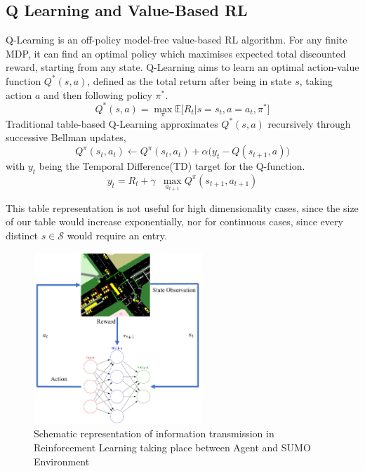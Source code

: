 \documentclass[conference]{IEEEtran}
\begin{document}
\subsection{Q Learning and Value-Based RL}
Q-Learning\cite{watkins} is an off-policy model-free value-based RL algorithm. For any finite MDP, it can find an optimal policy which maximises expected total discounted reward, starting from any state\cite{melo}.
Q-Learning aims to learn an optimal action-value function $Q^*(s,a)$, defined as the total return after being in state $s$, taking action $a$ and then following policy $\pi^*$. %
\begin{equation}
Q^*(s,a) = \max_{\pi} \mathbb{E} \big[ R_t | s=s_t, a=a_t, \pi^* \big]
\label{eq:qlearning}
\end{equation}
Traditional table-based Q-Learning approximates $Q^*(s,a)$ recursively through successive Bellman updates,
\begin{equation}
Q^{\pi}(s_t,a_t) \leftarrow Q^{\pi}(s_t,a_t) + \alpha \big( y_t - Q(s_{t+1},a) \big)
\label{eq:bellmanupdate}
\end{equation}
with $y_t$ being the Temporal Difference(TD) target for the Q-function.
\begin{equation}
y_t = R_t + \gamma \,\,\, \max_{a_{t+1}} Q^{\pi}(s_{t+1},a_{t+1})
\end{equation}

This table representation is not useful for high dimensionality cases, since the size of our table would increase exponentially, nor for continuous cases, since every distinct $s\in\mathcal{S}$ would require an entry.

\begin{figure}                                                
\centering                                                    
\includegraphics[width=2.5in]{schematic_pp2.png}                                    
\caption{Schematic representation of information transmission in Reinforcement Learning taking place between Agent and SUMO Environment}                                  
\label{rl}                                               
\end{figure}  
\end{document}
